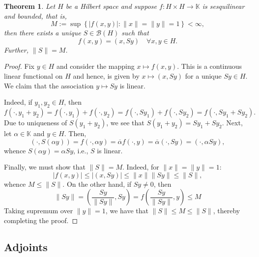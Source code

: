 \documentclass[12pt]{article}
\theoremstyle{thmstyle}
\newtheorem{theorem}{Theorem}[section]
\theoremstyle{defstyle}
\newcommand{\R}{\mathbb{R}}
\newcommand{\bbC}{\mathbb{C}}
\newcommand{\K}{\mathbb{K}} %
\newcommand{\scrB}{\mathscr B}
\renewcommand{\le}{\leqslant}
\begin{document}
\begin{theorem}
    Let $H$ be a Hilbert space and suppose $f: H\times H\to\K$ is sesquilinear and bounded, that is, 
    \begin{equation*}
        M := \sup\left\{|f(x, y)|\colon \|x\| = \|y\| = 1\right\} < \infty,
    \end{equation*}
    then there exists a unique $S\in\scrB(H)$ such that 
    \begin{equation*}
        f(x, y) = (x, Sy)\quad\forall x,y\in H.
    \end{equation*}
    Further, $\|S\| = M$.
\end{theorem}
\begin{proof}
    Fix $y\in H$ and consider the mapping $x\mapsto f(x, y)$. This is a continuous linear functional on $H$ and hence, is given by $x\mapsto (x, Sy)$ for a unique $Sy\in H$. We claim that the association $y\mapsto Sy$ is linear.

    Indeed, if $y_1, y_2\in H$, then 
    \begin{equation*}
        f(\cdot, y_1 + y_2) = f(\cdot, y_1) + f(\cdot, y_2) = f(\cdot, Sy_1) + f(\cdot, Sy_2) = f\left(\cdot, Sy_1 + Sy_2\right).
    \end{equation*}
    Due to uniqueness of $S(y_1 + y_2)$, we see that $S(y_1 + y_2) = Sy_1 + Sy_2$. Next, let $\alpha\in\K$ and $y\in H$. Then, 
    \begin{equation*}
        (\cdot, S(\alpha y)) = f(\cdot, \alpha y) = \overline\alpha f(\cdot, y) = \overline\alpha (\cdot, Sy) = (\cdot, \alpha Sy),
    \end{equation*}
    whence $S(\alpha y) = \alpha Sy$, i.e., $S$ is linear.

    Finally, we must show that $\|S\| = M$. Indeed, for $\|x\| = \|y\| = 1$:
    \begin{equation*}
        |f(x, y)|\le |(x, Sy)|\le \|x\|\|Sy\|\le\|S\|,
    \end{equation*}
    whence $M\le \|S\|$. On the other hand, if $Sy\ne 0$, then 
    \begin{equation*}
        \|Sy\| = \left(\frac{Sy}{\|Sy\|}, Sy\right) = f\left(\frac{Sy}{\|Sy\|}, y\right)\le M
    \end{equation*}
    Taking supremum over $\|y\| = 1$, we have that $\|S\|\le M\le \|S\|$, thereby completing the proof.
\end{proof}

\subsection{Adjoints}
\end{document}
